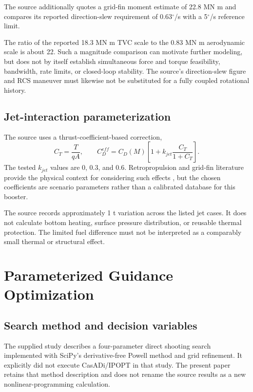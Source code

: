 \documentclass[11pt,a4paper]{article}
\begin{document}
The source additionally quotes a grid-fin moment estimate of 22.8 MN m and compares its reported direction-slew requirement of 0.63$^\circ$/s with a 5$^\circ$/s reference limit.

The ratio of the reported 18.3 MN m TVC scale to the 0.83 MN m aerodynamic scale is about 22. Such a magnitude comparison can motivate further modeling, but does not by itself establish simultaneous force and torque feasibility, bandwidth, rate limits, or closed-loop stability. The source's direction-slew figure and RCS maneuver must likewise not be substituted for a fully coupled rotational history.

\subsection{Jet-interaction parameterization}
The source uses a thrust-coefficient-based correction,
\begin{equation}
 C_T=\frac{T}{qA},\qquad
 C_D^{eff}=C_D(M)\left[1+k_{jet}\frac{C_T}{1+C_T}\right].
\label{eq:jet}
\end{equation}
The tested $k_{jet}$ values are 0, 0.3, and 0.6. Retropropulsion and grid-fin literature provide the physical context for considering such effects \cite{retro,korzun,gridfin}, but the chosen coefficients are scenario parameters rather than a calibrated database for this booster.




The source records approximately 1 t variation across the listed jet cases. It does not calculate bottom heating, surface pressure distribution, or reusable thermal protection. The limited fuel difference must not be interpreted as a comparably small thermal or structural effect.

\section{Parameterized Guidance Optimization}
\subsection{Search method and decision variables}
The supplied study describes a four-parameter direct shooting search implemented with SciPy's derivative-free Powell method and grid refinement. It explicitly did not execute CasADi/IPOPT in that study. The present paper retains that method description and does not rename the source results as a new nonlinear-programming calculation.
\end{document}
